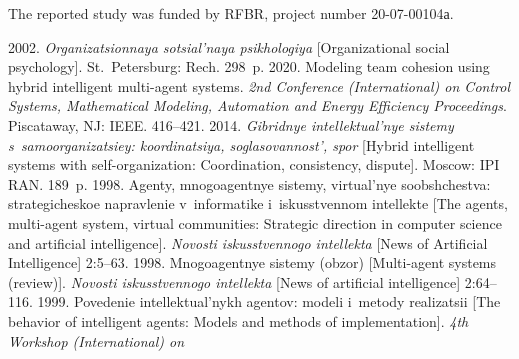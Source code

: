    
  
   

\vspace*{-15pt}

 \Ack
   \noindent
   The reported study was funded by RFBR, project number 20-07-00104а.


  \begin{multicols}{2}

\renewcommand{\bibname}{\protect\rmfamily References}

{\small\frenchspacing
 {%
 \begin{thebibliography}{99}
   2002. \textit{Organizatsionnaya sotsial'naya psikhologiya} [Organizational 
social psychology]. St.\ Petersburg: Rech. 298~p.
   2020. Modeling team cohesion using hybrid intelligent multi-agent systems. 
  \textit{2nd Conference (International) on Control Systems, Mathematical Modeling, Automation 
  and Energy Efficiency Proceedings}. Piscataway, NJ: IEEE. 416--421.
   2014. \textit{Gibridnye intellektual'nye sistemy 
  s~samoorganizatsiey: koordinatsiya, soglasovannost', spor} [Hybrid intelligent systems with 
  self-organization: Coordination, consistency, dispute]. Moscow: IPI RAN. 189~p.
   1998. Agenty, mnogoagentnye sistemy, virtual'nye soobshchestva: strategicheskoe 
napravlenie v~informatike i~iskusstvennom intellekte [The agents, multi-agent system, virtual communities: 
Strategic direction in computer science and artificial intelligence]. 
\textit{Novosti iskusstvennogo intellekta} [News of 
Artificial Intelligence] 2:5--63.
   1998. Mnogoagentnye sistemy (obzor) 
[Multi-agent systems (review)]. \textit{Novosti iskusstvennogo intellekta}
 [News of artificial intelligence] 2:64--116.
   1999. Povedenie intellektual'nykh agentov: modeli i~metody realizatsii [The 
behavior of intelligent agents: Models and methods of implementation]. 
\textit{4th Workshop (International) on 
}
\end{thebibliography}}}
\end{multicols}
